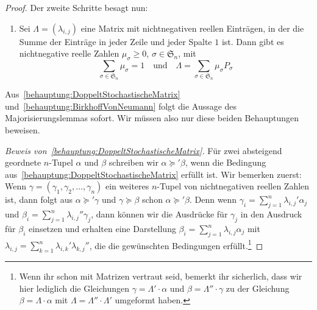 \begin{proof}
	Der zweite Schritte besagt nun:
	\begin{enumerate}[resume,label=\textup{(\arabic*)},ref=\textup{(\arabic*)}]\itshape
		\item Sei $\Lambda=(\lambda_{i,j})$ eine Matrix mit nichtnegativen reellen Einträgen, in der die Summe der Einträge in jeder Zeile und jeder Spalte $1$ ist. Dann gibt es nichtnegative reelle Zahlen $\mu_\sigma\geqslant 0$, $\sigma\in\mathfrak S_n$, mit\label{behauptung:BirkhoffVonNeumann}
		\begin{equation*}
			\sum_{\sigma\in\mathfrak S_n}\mu_\sigma=1\quad\text{und}\quad \Lambda=\sum_{\sigma\in\mathfrak S_n}\mu_\sigma P_\sigma
		\end{equation*}
	\end{enumerate}
	Aus~\ref{behauptung:DoppeltStochastischeMatrix} und~\ref{behauptung:BirkhoffVonNeumann} folgt die Aussage des Majorisierungslemmas sofort. Wir müssen also nur diese beiden Behauptungen beweisen.
	
	\emph{Beweis von~\ref{behauptung:DoppeltStochastischeMatrix}.} Für zwei absteigend geordnete $n$-Tupel $\alpha$ und $\beta$ schreiben wir $\alpha\succcurlyeq'\beta$, wenn die Bedingung aus~\ref{behauptung:DoppeltStochastischeMatrix} erfüllt ist. Wir bemerken zuerst: Wenn $\gamma=(\gamma_1,\gamma_2,\dotsc,\gamma_n)$ ein weiteres $n$-Tupel von nichtnegativen reellen Zahlen ist, dann folgt aus $\alpha\succcurlyeq'\gamma$ und $\gamma\succcurlyeq\beta$ schon $\alpha\succcurlyeq' \beta$. Denn wenn $\gamma_i=\sum_{j=1}^n\lambda_{i,j}'\alpha_j$ und $\beta_i=\sum_{j=1}^n\lambda_{i,j}''\gamma_j$, dann können wir die Ausdrücke für $\gamma_j$ in den Ausdruck für $\beta_i$ einsetzen und erhalten eine Darstellung $\beta_i=\sum_{j=1}^n\lambda_{i,j}\alpha_j$ mit $\lambda_{i,j}=\sum_{k=1}^n\lambda_{i,k}'\lambda_{k,j}''$, die die gewünschten Bedingungen erfüllt.\footnote{Wenn ihr schon mit Matrizen vertraut seid, bemerkt ihr sicherlich, dass wir hier lediglich die Gleichungen $\gamma=\Lambda'\cdot \alpha$ und $\beta=\Lambda''\cdot \gamma$ zu der Gleichung $\beta=\Lambda\cdot \alpha$ mit $\Lambda=\Lambda''\cdot\Lambda'$ umgeformt haben.}
	

\end{proof}
